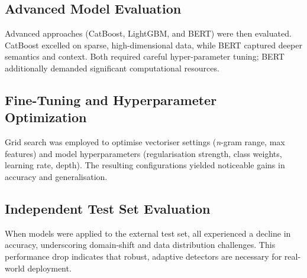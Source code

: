 \subsection{Advanced Model Evaluation}  %
Advanced approaches (CatBoost, LightGBM, and BERT) were
then evaluated. CatBoost excelled on sparse, high-dimensional data,
while BERT captured deeper semantics and context. Both required careful
hyper-parameter tuning; BERT additionally demanded significant
computational resources.

\subsection{Fine-Tuning and Hyperparameter Optimization}  %
Grid search was employed to optimise vectoriser settings
(\emph{n}-gram range, max features) and model hyperparameters
(regularisation strength, class weights, learning rate, depth). The
resulting configurations yielded noticeable gains in accuracy and
generalisation.

\subsection{Independent Test Set Evaluation}  %
When models were applied to the external test set, all experienced a
decline in accuracy, underscoring domain-shift and data distribution
challenges. This performance drop indicates that robust, adaptive
detectors are necessary for real-world deployment.